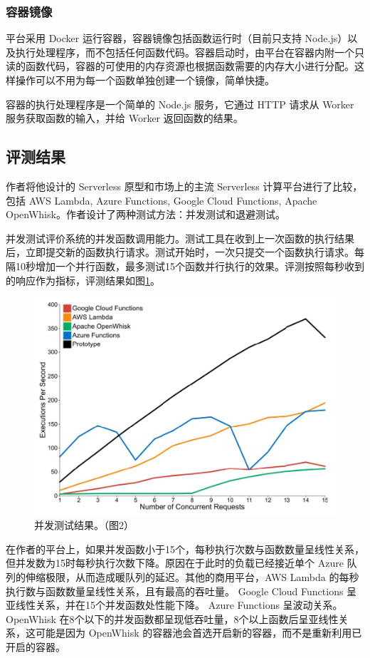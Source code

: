 \documentclass[11pt]{article}
\begin{document}
\subsubsection{容器镜像}
平台采用 Docker 运行容器，容器镜像包括函数运行时（目前只支持 Node.js）以及执行处理程序，而不包括任何函数代码。容器启动时，由平台在容器内附一个只读的函数代码，容器的可使用的内存资源也根据函数需要的内存大小进行分配。这样操作可以不用为每一个函数单独创建一个镜像，简单快捷。


容器的执行处理程序是一个简单的 Node.js 服务，它通过 HTTP 请求从 Worker 服务获取函数的输入，并给 Worker 返回函数的结果。

\subsection{评测结果}
作者将他设计的 Serverless 原型和市场上的主流 Serverless 计算平台进行了比较，包括 AWS Lambda, Azure Functions, Google Cloud Functions, Apache OpenWhisk。作者设计了两种测试方法：并发测试和退避测试。


并发测试评价系统的并发函数调用能力。测试工具在收到上一次函数的执行结果后，立即提交新的函数执行请求。测试开始时，一次只提交一个函数执行请求。每隔10秒增加一个并行函数，最多测试15个函数并行执行的效果。评测按照每秒收到的响应作为指标，评测结果如图\ref{figs:2017_concuttent_test}。
\begin{figure}[!htbp]
	\centering
	\includegraphics[width=0.8\linewidth]{figs/2017_concuttent_test}
	\caption{并发测试结果。（\cite{mcgrath2017serverless}图2）}
	\label{figs:2017_concuttent_test}
\end{figure}


在作者的平台上，如果并发函数小于15个，每秒执行次数与函数数量呈线性关系，但并发数为15时每秒执行次数下降。原因在于此时的负载已经接近单个 Azure 队列的伸缩极限，从而造成暖队列的延迟。其他的商用平台，AWS Lambda 的每秒执行数与函数数量呈线性关系，且有最高的吞吐量。 Google Cloud Functions 呈亚线性关系，并在15个并发函数处性能下降。 Azure Functions 呈波动关系。 OpenWhisk 在8个以下的并发函数都呈现低吞吐量，8个以上函数后呈亚线性关系，这可能是因为 OpenWhisk 的容器池会首选开启新的容器，而不是重新利用已开启的容器。
\end{document}
